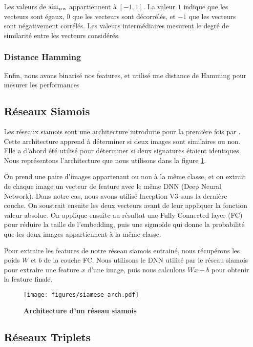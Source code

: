 Les valeurs de $\operatorname*{sim_{cos}}$ appartiennent à $\left[-1, 1\right]$. La valeur $1$ indique que les vecteurs sont égaux, $0$
que les vecteurs sont décorrélés, et $-1$ que les vecteurs sont négativement corrélés. Les valeurs intermédiaires
mesurent le degré de similarité entre les vecteurs considérés.

\subsubsection{Distance Hamming}

Enfin, nous avons binarisé nos features, et utilisé une distance de Hamming pour mesurer les performances

\subsection{R\'eseaux Siamois}

Les réseaux siamois sont une architecture introduite pour la première fois par \cite{signature1993bromley}. Cette
architecture apprend à déterminer si deux images sont similaires ou non. Elle a d'abord été utilisé pour déterminer si
deux signatures étaient identiques. Nous représentons l'architecture que nous utilisons dans la figure
\ref{fig:siamese_arch}.

On prend une paire d'images appartenant ou non à la même classe, et on extrait de chaque image un vecteur de feature
avec le même DNN (Deep Neural Network). Dans notre cas, nous avons utilisé Inception V3 sans la dernière couche. On
soustrait ensuite les deux vecteurs avant de leur appliquer la fonction valeur absolue. On applique ensuite au résultat
une Fully Connected layer (FC) pour réduire la taille de l'embedding, puis une sigmoïde qui donne la probabilité que
les deux images appartiennent à la même classe.

Pour extraire les features de notre réseau siamois entrainé, nous récupérons les poids $W$ et $b$ de la couche FC. Nous
utilisons le DNN utilisé par le réseau siamois pour extraire une feature $x$ d'une image, puis nous calculons $Wx + b$
pour obtenir la feature finale.

\begin{figure}[ht]
    \center
    \texttt{[image: figures/siamese\_arch.pdf]}
    \caption{\label{fig:siamese_arch} \textbf{Architecture d'un r\'eseau siamois}}
\end{figure}

\subsection{R\'eseaux Triplets}

